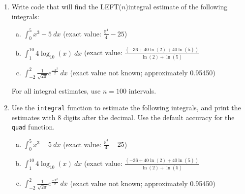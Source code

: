 \begin{enumerate}[1.]
\item \begin{Question}
Write code that will find the LEFT($n$)integral estimate of the
  following integrals: 
\begin{enumerate}[(a)]
\item $\displaystyle \int_0^5 x^3 - 5~dx$  (exact value: $\displaystyle \frac{5^4}{4} - 25$)
\item $\displaystyle \int_1^{10} 4 \log_{10}(x)~dx$ (exact value: 
$\displaystyle \frac{(-36+40 \ln(2)+40 \ln(5))}{\ln(2)+\ln(5)}$
\item $\displaystyle \int_{-2}^2 \frac{1}{\sqrt{2 \pi}} e^{\frac{-x^2}{2}}~dx$ (exact value not known; approximately  0.95450)
\end{enumerate} 
For all integral estimates, use $n = 100$ intervals.
  \end{Question}

\begin{Solution}
\end{Solution}


\item 
  \begin{Question}
Use the \verb#integral# function to estimate the following
  integrals, and print the estimates with 8 digits after the decimal.
  Use the default accuracy for the \verb#quad# function.
\begin{enumerate}[(a)]
\item $\displaystyle \int_0^5 x^3 - 5~dx$  (exact value: $\displaystyle \frac{5^4}{4} - 25$)
\item $\displaystyle \int_1^{10} 4 \log_{10}(x)~dx$ (exact value: 
$\displaystyle \frac{(-36+40 \ln(2)+40 \ln(5))}{\ln(2)+\ln(5)}$
\item $\displaystyle \int_{-2}^2 \frac{1}{\sqrt{2 \pi}} e^{\frac{-x^2}{2}}~dx$ (exact value not known; approximately  0.95450)
\end{enumerate}
  \end{Question}


\end{enumerate}
